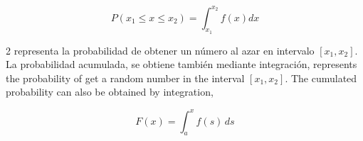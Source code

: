 \begin{equation*}
P(x_1 \leqslant x \leqslant x_2) = \int_{x_1}^{x_2}f(x)dx
\end{equation*}

\begin{paracol}{2}
\noindent representa la probabilidad de obtener un número al azar en intervalo $[x_1,x_2]$. 
La probabilidad acumulada, se obtiene también mediante integración,
\switchcolumn
\noindent represents the probability of get a random number in the interval $[x_1,x_2]$. The cumulated probability can also be obtained by integration,
\end{paracol} 

\begin{equation*}
F(x) = \int_a^x f(s)\,ds
\end{equation*}

